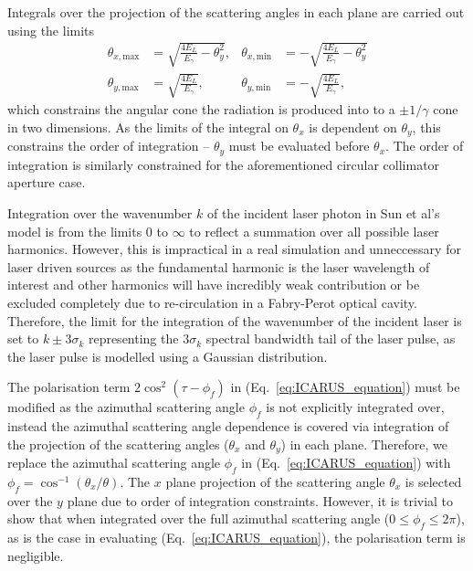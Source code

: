 \documentclass[../main.tex]{subfiles}
\begin{document}
Integrals over the projection of the scattering angles in each plane are carried out using the limits
\begin{align}
\theta_{x,\mathrm{max}} &= \sqrt{\frac{4E_{L}}{E_{\gamma}}-\theta_{y}^{2}}, & \theta_{x,\mathrm{min}} &= -\sqrt{\frac{4E_{L}}{E_{\gamma}}-\theta_{y}^{2}} \nonumber\\ 
\theta_{y,\mathrm{max}} &= \sqrt{\frac{4E_{L}}{E_{\gamma}}}, & \theta_{y,\mathrm{min}} &= -\sqrt{\frac{4E_{L}}{E_{\gamma}}},  
\end{align}
which constrains the angular cone the radiation is produced into to a $\pm 1/\gamma$ cone in two dimensions. As the limits of the integral on $\theta_{x}$ is dependent on  $\theta_{y}$, this constrains the order of integration -- $\theta_{y}$ must be evaluated before $\theta_{x}$. The order of integration is similarly constrained for the aforementioned circular collimator aperture case.

Integration over the wavenumber $k$ of the incident laser photon in Sun et al's model \cite{sun2009characterizations,sun2011theoretical} is from the limits $0$ to $\infty$ to reflect a summation over all possible laser harmonics. However, this is impractical in a real simulation and unneccessary for laser driven sources as the fundamental harmonic is the laser wavelength of interest and other harmonics will have incredibly weak contribution or be excluded completely due to re-circulation in a Fabry-Perot optical cavity. Therefore, the limit for the integration of the wavenumber of the incident laser is set to $k\pm3\sigma_{k}$ representing the 3$\sigma_{k}$ spectral bandwidth tail of the laser pulse, as the laser pulse is modelled using a Gaussian distribution.  

The polarisation term $2\cos^{2}\left(\tau-\phi_{f}\right)$ in (Eq.~\ref{eq:ICARUS_equation}) must be modified as the azimuthal scattering angle $\phi_{f}$ is not explicitly integrated over, instead the azimuthal scattering angle dependence is covered via integration of the projection of the scattering angles ($\theta_{x}$ and $\theta_{y}$) in each plane. Therefore, we replace the azimuthal scattering angle $\phi_{f}$ in (Eq.~\ref{eq:ICARUS_equation}) with $\phi_{f} = \cos^{-1}\left(\theta_{x}/\theta\right)$. The $x$ plane projection of the scattering angle $\theta_{x}$ is selected over the $y$ plane due to order of integration constraints. However, it is trivial to show that when integrated over the full azimuthal scattering angle ($0 \leq \phi_{f} \leq 2\pi$), as is the case in evaluating (Eq.~\ref{eq:ICARUS_equation}), the polarisation term is negligible.
\end{document}
